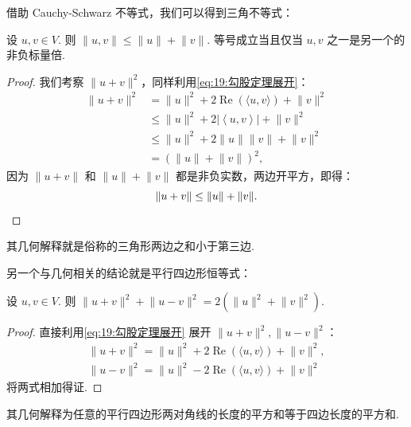借助 Cauchy-Schwarz 不等式，我们可以得到三角不等式：

\begin{theorem}{}{}
    设 $u, v \in V$. 则 $\lVert u, v \rVert \leqslant \lVert u \rVert + \lVert v \rVert$. 等号成立当且仅当 $u, v$ 之一是另一个的非负标量倍.
\end{theorem}

\begin{proof}
    我们考察 $\lVert u + v \rVert^2$，同样利用\autoref{eq:19:勾股定理展开}：
    \begin{align*}
    \lVert u + v \rVert^2 & = \lVert u \rVert^2 + 2 \operatorname{Re}(\langle u, v \rangle) + \lVert v \rVert^2 \\
                          & \leqslant \lVert u \rVert^2 + 2 \left\lvert \left\langle u, v\right\rangle \right\rvert + \lVert v \rVert^2 \\
                          & \leqslant \lVert u \rVert^2 + 2 \lVert u \rVert\lVert v \rVert + \lVert v \rVert^2 \\
                          & = (\lVert u \rVert + \lVert v \rVert)^2,
    \end{align*}
    因为 $\lVert u + v \rVert$ 和 $\lVert u \rVert + \lVert v \rVert$ 都是非负实数，两边开平方，即得：
    \[\lVert u + v \rVert \le \lVert u \rVert + \lVert v \rVert. \qedhere\]
\end{proof}

其几何解释就是俗称的三角形两边之和小于第三边.

另一个与几何相关的结论就是平行四边形恒等式：

\begin{theorem}{}{}
    设 $u, v \in V$. 则 $ \lVert u + v \rVert^{2} + \lVert u - v \rVert^{2} = 2(\lVert u \rVert^{2} + \lVert v \rVert^{2})$.
\end{theorem}

\begin{proof}
    直接利用\autoref{eq:19:勾股定理展开} 展开 $\lVert u + v \rVert^2, \lVert u - v \rVert^2$：
    \begin{gather*}
        \lVert u + v \rVert^2 = \lVert u \rVert^2 + 2 \operatorname{Re}(\langle u, v \rangle) + \lVert v \rVert^2, \\
        \lVert u - v \rVert^2 = \lVert u \rVert^2 - 2 \operatorname{Re}(\langle u, v \rangle) + \lVert v \rVert^2
    \end{gather*}
    将两式相加得证.
\end{proof}

其几何解释为任意的平行四边形两对角线的长度的平方和等于四边长度的平方和.

